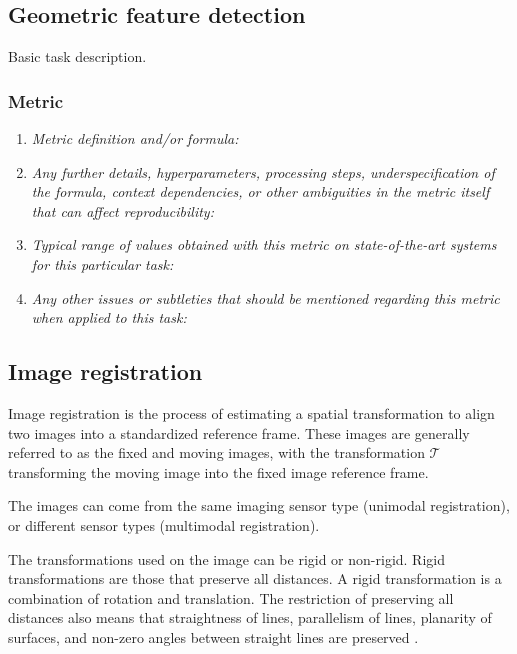 \documentclass[a4paper,11pt]{article}
\begin{document}
    \subsection{Geometric feature detection}
        Basic task description.
        \subsubsection{Metric}
            \begin{enumerate}[label=\alph*.]
                \item \textit{Metric definition and/or formula:}
                \bigskip
                \item \textit{Any further details, hyperparameters, processing steps, underspecification of the formula, context dependencies, or other ambiguities in the metric itself that can affect reproducibility:}
                \bigskip
                \item \textit{Typical range of values obtained with this metric on state-of-the-art systems for this particular task:}
                \bigskip
                \item \textit{Any other issues or subtleties that should be mentioned regarding this metric when applied to this task:}
                \bigskip
            \end{enumerate}

    \subsection{Image registration}
        Image registration is the process of estimating a spatial transformation to align two images into a standardized reference frame. These images are generally referred to as the fixed and moving images, with the transformation $\mathcal{T}$ transforming the moving image into the fixed image reference frame.

        The images can come from the same imaging sensor type (unimodal registration), or different sensor types (multimodal registration). 

        The transformations used on the image can be rigid or non-rigid. Rigid transformations are those that preserve all distances. A rigid transformation is a combination of rotation and translation. The restriction of preserving all distances also means that straightness of lines, parallelism of lines, planarity of surfaces, and non-zero angles between straight lines are preserved \cite{fitzpatrick2000image}. 
\end{document}
